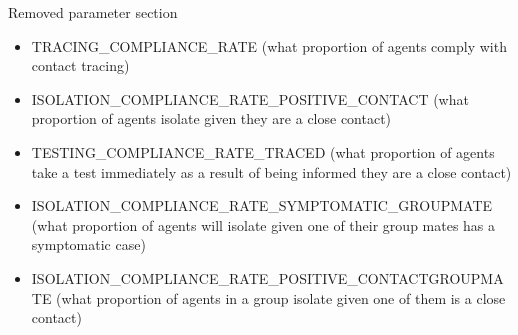 \documentclass{article}
\begin{document}
Removed parameter section
\begin{itemize}

\item TRACING\_COMPLIANCE\_RATE (what proportion of agents comply with contact tracing)
\item ISOLATION\_COMPLIANCE\_RATE\_POSITIVE\_CONTACT (what proportion of agents isolate given they are a close contact) 

\item TESTING\_COMPLIANCE\_RATE\_TRACED (what proportion of agents take a test immediately as a result of being informed they are a close contact)


\item ISOLATION\_COMPLIANCE\_RATE\_SYMPTOMATIC\_GROUPMATE (what proportion of agents will isolate given one of their group mates has a symptomatic case)

\item ISOLATION\_COMPLIANCE\_RATE\_POSITIVE\_CONTACTGROUPMATE (what proportion of agents in a group isolate given one of them is a close contact)
\end{itemize}

{}

\end{document}
